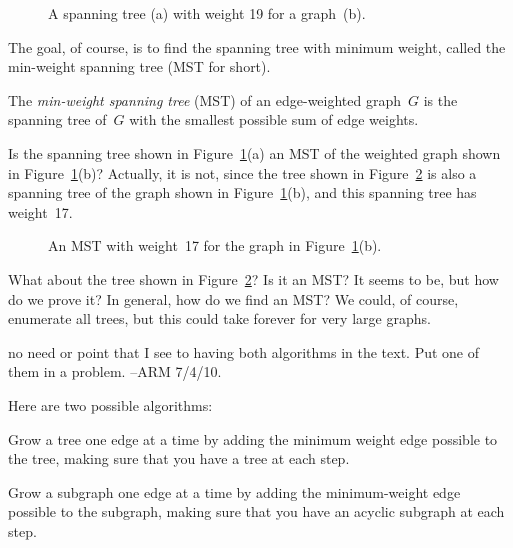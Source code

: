 \begin{figure}

%
\qquad
%

\caption{A spanning tree (a) with weight 19 for a graph~(b).}

\label{fig:5KA}

\end{figure}

The goal, of course, is to find the spanning tree with minimum weight,
called the min-weight spanning tree (MST for short).

\begin{definition}
The \emph{min-weight spanning tree} \textup(MST\textup) of an
edge-weighted graph~$G$ is the spanning tree of~$G$ with the smallest
possible sum of edge weights.
\end{definition}

Is the spanning tree shown in Figure~\ref{fig:5KA}(a) an MST of the
weighted graph shown in Figure~\ref{fig:5KA}(b)?  Actually, it is not,
since the tree shown in Figure~\ref{fig:5KB} is also a spanning tree
of the graph shown in Figure~\ref{fig:5KA}(b), and this spanning tree
has weight~17.

\begin{figure}


\caption{An MST with weight~17 for the graph in
  Figure~\ref{fig:5KA}(b).}
\label{fig:5KB}

\end{figure}

What about the tree shown in Figure~\ref{fig:5KB}?  Is it an MST?  It
seems to be, but how do we prove it?  In general, how do we find an
MST\@?  We could, of course, enumerate all trees, but this could take
forever for very large graphs.

\begin{staffnotes}no need or point that I see to having both
  algorithms in the text.  Put one of them in a problem. --ARM 7/4/10.
\end{staffnotes}
Here are two possible algorithms:

\begin{algorithm}\label{alg:MST1}
  Grow a tree one edge at a time by adding the minimum weight edge
  possible to the tree, making sure that you have a tree at each
  step.
\end{algorithm}

\begin{algorithm}\label{alg:MST2}
Grow a subgraph one edge at a time by adding the minimum-weight edge
possible to the subgraph, making sure that you have an acyclic
subgraph at each step.
\end{algorithm}


